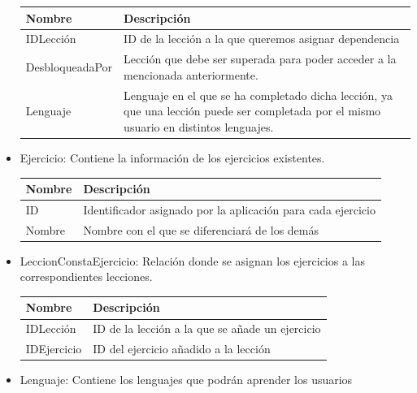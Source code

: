 \begin{itemize}
\begin{tabularx}{15cm}{|l|X|}
\hline
\textbf{Nombre} & \textbf{Descripción}                                                              \\ \hline
IDLección       & ID de la lección a la que queremos asignar dependencia                                                          \\ \hline
DesbloqueadaPor     & Lección que debe ser superada para poder acceder a la mencionada anteriormente.                                           \\ \hline
Lenguaje            & Lenguaje en el que se ha completado dicha lección, ya que una lección puede ser completada por el mismo usuario en distintos lenguajes. \\ \hline
\end{tabularx}
\vspace{1em}

\item Ejercicio: Contiene la información de los ejercicios existentes.

\begin{tabularx}{15cm}{|l|X|}
\hline
\textbf{Nombre} & \textbf{Descripción}                                                              \\ \hline
ID       & Identificador asignado por la aplicación para cada ejercicio \\ \hline
Nombre     & Nombre con el que se diferenciará de los demás                                           \\ \hline
\end{tabularx}
\vspace{1em}

\item LeccionConstaEjercicio: Relación donde se asignan los ejercicios a las correspondientes lecciones.

\begin{tabularx}{15cm}{|l|X|}
\hline
\textbf{Nombre} & \textbf{Descripción}                                                              \\ \hline
IDLección       & ID de la lección a la que se añade un ejercicio \\ \hline
IDEjercicio     & ID del ejercicio añadido a la lección                                           \\ \hline
\end{tabularx}
\vspace{1em}

\item Lenguaje: Contiene los lenguajes que podrán aprender los usuarios


\end{itemize}
